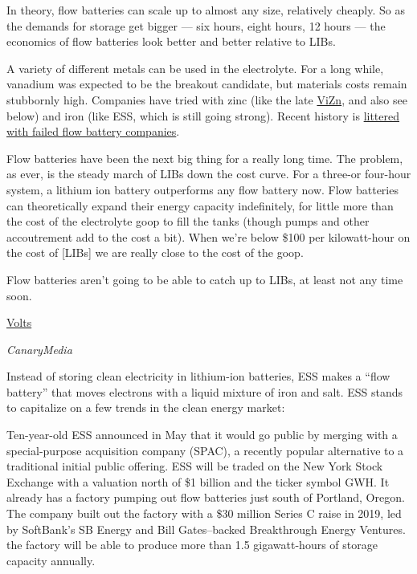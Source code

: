 \documentclass[
]{book}
\begin{document}
In theory, flow batteries can scale up to almost any size, relatively cheaply. So as the demands for storage get bigger --- six hours, eight hours, 12 hours --- the economics of flow batteries look better and better relative to LIBs.

A variety of different metals can be used in the electrolyte. For a long while, vanadium was expected to be the breakout candidate, but materials costs remain stubbornly high. Companies have tried with zinc (like the late \href{https://www.greentechmedia.com/articles/read/distressed-vizn-seeks-lifeline-following-staff-layoffs}{ViZn}, and also see below) and iron (like ESS, which is still going strong). Recent history is \href{https://www.greentechmedia.com/articles/read/flow-batteries-struggle-in-2019-as-lithium-ion-marches-on}{littered with failed flow battery companies}.

Flow batteries have been the next big thing for a really long time.
The problem, as ever, is the steady march of LIBs down the cost curve.
For a three-or four-hour system, a lithium ion battery outperforms any flow battery now.
Flow batteries can theoretically expand their energy capacity indefinitely, for little more than the cost of the electrolyte goop to fill the tanks (though pumps and other accoutrement add to the cost a bit).
When we're below \$100 per kilowatt-hour on the cost of {[}LIBs{]} we are really close to the cost of the goop.

Flow batteries aren't going to be able to catch up to LIBs, at least not any time soon.

\href{https://www.volts.wtf/p/battery-week-competitors-to-lithium}{Volts}

\emph{CanaryMedia}

Instead of storing clean electricity in lithium-ion batteries, ESS makes a ``flow battery'' that moves electrons with a liquid mixture of iron and salt. ESS stands to capitalize on a few trends in the clean energy market:

Ten-year-old ESS announced in May that it would go public by merging with a special-purpose acquisition company (SPAC), a recently popular alternative to a traditional initial public offering.
ESS will be traded on the New York Stock Exchange with a valuation north of \$1 billion and the ticker symbol GWH.
It already has a factory pumping out flow batteries just south of Portland, Oregon.
The company built out the factory with a \$30 million Series C raise in 2019, led by SoftBank's SB Energy and Bill Gates--backed Breakthrough Energy Ventures.
the factory will be able to produce more than 1.5 gigawatt-hours of storage capacity annually.
\end{document}
